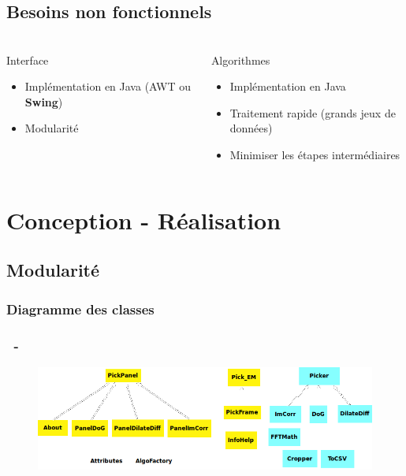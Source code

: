 \documentclass[11pt]{beamer}
\begin{document}
\subsection{Besoins non fonctionnels}

\begin{frame}
\frametitle{\subsecname}
	\begin{columns}[t]
		\begin{column}{5cm}
			\begin{block}{Interface}
				\begin{itemize}
					\item Implémentation en Java (AWT ou \textbf{Swing})
					\item Modularité
				\end{itemize}
			\end{block}
		\end{column}
		\begin{column}{5cm}
			\begin{block}{Algorithmes}
				\begin{itemize}
					\item Implémentation en Java
					\item Traitement rapide (grands jeux de données)
					\item Minimiser les étapes intermédiaires
				\end{itemize}
			\end{block}
		\end{column}
	\end{columns}
\end{frame}

\section{Conception - Réalisation}

\subsection{Modularité}

\subsubsection*{Diagramme des classes}
\begin{frame}
\frametitle{\subsecname ~- \subsubsecname}
	\begin{figure}
		\includegraphics[scale=0.45]{NouvDiag1.png}
	\end{figure}
\end{frame}
\end{document}
